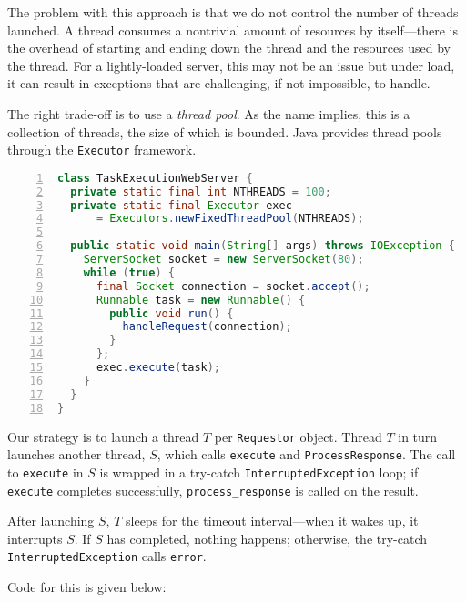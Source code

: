 The problem with this approach is that we do not control the
number of threads launched. A thread consumes a nontrivial
amount of resources by itself---there is the overhead of
starting and ending down the thread and the resources
used by the thread. For a lightly-loaded server,
this may not be an issue but under load, it can result in 
exceptions that are challenging, if not impossible, to handle.

The right trade-off is to use a {\em thread pool}. As the 
name implies, this is a collection of threads, the size of which
is bounded. Java provides thread pools through the \texttt{Executor}
framework. 

\begin{lstlisting}[basicstyle=\footnotesize,numbers=left,breaklines=true,language=Java]
class TaskExecutionWebServer {
  private static final int NTHREADS = 100;
  private static final Executor exec 
      = Executors.newFixedThreadPool(NTHREADS);

  public static void main(String[] args) throws IOException {
    ServerSocket socket = new ServerSocket(80);
    while (true) {
      final Socket connection = socket.accept();
      Runnable task = new Runnable() {
        public void run() {
          handleRequest(connection);
        }
      };
      exec.execute(task);
    }
  }
}
\end{lstlisting}
       
Our strategy is to launch a thread $T$ per \texttt{Requestor} object. 
Thread $T$ in turn launches another thread, $S$, which calls 
\texttt{execute} and \texttt{ProcessResponse}. 
The call to \texttt{execute} in $S$
is wrapped in a try-catch \texttt{InterruptedException} loop;
if \texttt{execute} completes successfully,
\texttt{process_response} is called on the result.

After launching $S$, $T$ sleeps for the timeout interval---when
it wakes up, it interrupts $S$. If $S$ has completed, nothing happens; otherwise, the try-catch \texttt{InterruptedException} calls \texttt{error}.

Code for this is given below:


\begin{comment}
Send requests, register call-backs.  Responses are asynchronous.
Need to demultiplex messages---unique identifier.
Can have fault-tolerance in the form of time-outs, does not appreciably add
to the overhead.
Need a single thread to manage the demuxing.
\end{comment}

